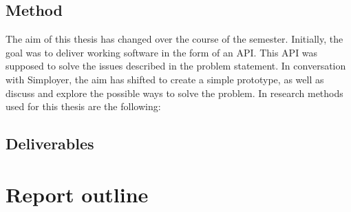 \subsection{Method}\label{subsec:method}
The aim of this thesis has changed over the course of the semester.
Initially, the goal was to deliver working software in the form of an API.
This API was supposed to solve the issues described in the problem statement.
In conversation with Simployer, the aim has shifted to create a simple prototype, as well as discuss and explore the possible ways to solve the problem.
In research methods used for this thesis are the following:
\begin{description}
\end{description}

\subsection{Deliverables}\label{subsec:deliverables}

\section{Report outline}\label{sec:report-outline}



